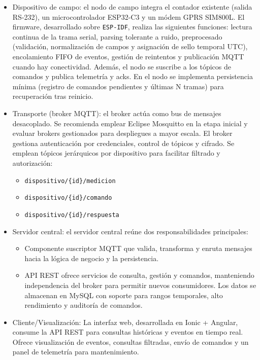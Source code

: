 \begin{itemize}

  \item {Dispositivo de campo:} el nodo de campo integra el contador existente (salida RS-232), un microcontrolador ESP32-C3 y un módem GPRS SIM800L. El firmware, desarrollado sobre \texttt{ESP-IDF}, realiza las siguientes funciones: lectura continua de la trama serial, parsing tolerante a ruido, preprocesado (validación, normalización de campos y asignación de sello temporal UTC), encolamiento FIFO de eventos, gestión de reintentos y publicación MQTT cuando hay conectividad. Además, el nodo se suscribe a los tópicos de comandos y publica telemetría y acks. En el nodo se implementa persistencia mínima (registro de comandos pendientes y últimas N tramas) para recuperación tras reinicio.

  \item {Transporte (broker MQTT):} el broker actúa como bus de mensajes desacoplado. Se recomienda emplear Eclipse Mosquitto en la etapa inicial y evaluar brokers gestionados para despliegues a mayor escala. El broker gestiona autenticación por credenciales, control de tópicos y cifrado. Se emplean tópicos jerárquicos por dispositivo para facilitar filtrado y autorización: 

\begin{itemize}
  \item \texttt{dispositivo/\{id\}/medicion}
  \item \texttt{dispositivo/\{id\}/comando} 
  \item \texttt{dispositivo/\{id\}/respuesta}
\end{itemize}


\item {Servidor central:} el servidor central reúne dos responsabilidades principales: 

\begin{itemize}  

\item  Componente suscriptor MQTT que valida, transforma y enruta mensajes hacia la lógica de negocio y la persistencia.

\item API REST  ofrece servicios de consulta, gestión y comandos, manteniendo independencia del broker para permitir nuevos consumidores. Los datos se almacenan en MySQL con soporte para rangos temporales, alto rendimiento y auditoría de comandos.
 \end{itemize}

\item Cliente/Visualización: La interfaz web, desarrollada en Ionic + Angular, consume la API REST para consultas históricas y eventos en tiempo real. Ofrece visualización de eventos, consultas filtradas, envío de comandos y un panel de telemetría para mantenimiento.
\end{itemize}


